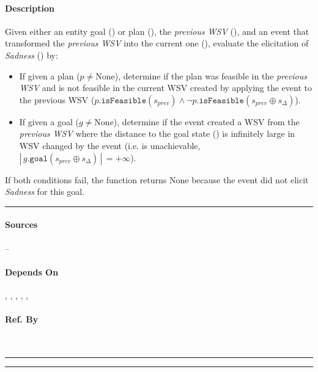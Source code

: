 \paragraph{Description} Given either an entity goal () or plan
(), the \textit{previous WSV} (), and an
event that transformed the \textit{previous WSV} into the current one
(), evaluate the elicitation of \textit{Sadness}
() by:
\begin{itemize}

    \item If given a plan ($p \neq \text{None}$), determine if the plan was
    feasible in the \textit{previous WSV} and is not feasible in the current
    WSV created by applying the event to the previous WSV
    ($p.\mathtt{isFeasible}(s_{prev}) \land \neg p.\mathtt{isFeasible}(s_{prev}
    \oplus s_\Delta)$).

    \item If given a goal ($g \neq \text{None}$), determine if the event
    created a WSV from the \textit{previous WSV} where the distance to the goal
    state () is infinitely large in WSV
    changed by the event (i.e. is unachievable, $| \, g.\mathtt{goal}(s_{prev}
    \oplus s_\Delta) \, | \, = +\infty$).

\end{itemize}

If both conditions fail, the function returns None because the event did not
elicit \textit{Sadness} for this goal. \\\hrule

\paragraph{Sources} --

\paragraph{Depends On} , ,
, ,
, 

\paragraph{Ref. By}  \\\hrule\vspace{0.5mm}\hrule

